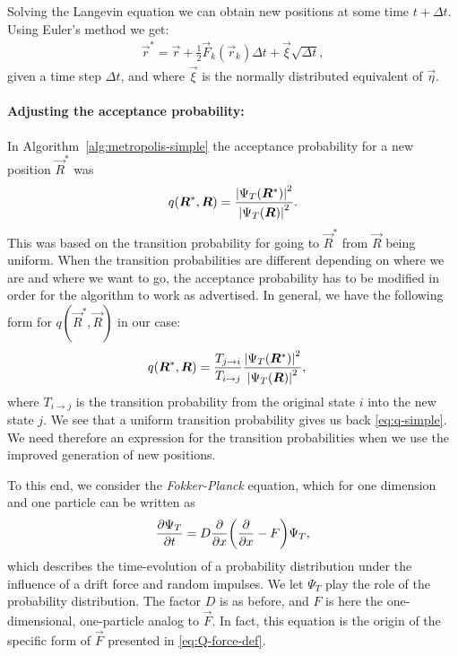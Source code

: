 \documentclass[twocolumn]{article}
\begin{document}
Solving the Langevin equation we can obtain new positions at some time
$t+\Delta t$. Using Euler's method we get:
\begin{align}
    \vec r^* = \vec r + \frac{1}{2}\vec F_k(\vec r_k)\Delta t + \vec \xi\sqrt{\Delta
    t}\label{eq:Langevin-solution},
\end{align}
given a time step $\Delta t$, and where $\vec \xi$ is the normally distributed
equivalent of $\vec \eta$. 

\paragraph{Adjusting the acceptance probability:}$\,$\\
In Algorithm~\ref{alg:metropolis-simple} the acceptance probability for a new
position $\vec R^*$ was
\begin{align}
    q(\bm R^*, \bm R) = \frac{\abs{\Psi_T(\bm R^*)}^2}{\abs{\Psi_T(\bm
    R)}^2}\label{eq:q-simple}.
\end{align}
This was based on the transition probability for going to $\vec R^*$ from $\vec
R$ being uniform. When the transition probabilities are different depending on 
where we are and where we want to go, the acceptance probability has to be
modified in order for the algorithm to work as advertised. In general, we have 
the following form for $q(\vec R^*, \vec R)$ in our case:
\begin{align}
    q(\bm R^*, \bm R) &= \frac{T_{j\rightarrow i}}{T_{i\rightarrow j}}\frac{\abs{\Psi_T(\bm R^*)}^2}{\abs{\Psi_T(\bm
    R)}^2},\label{eq:q-full}
\end{align}
where $T_{i\rightarrow j}$ is the transition probability from the original state
$i$ into the new state $j$. We see that a uniform transition probability gives
us back \eqref{eq:q-simple}. We need therefore an expression for the transition
probabilities when we use the improved generation of new positions.


To this end, we consider the \textit{Fokker-Planck} equation, which for one
dimension and one particle can be written as
\begin{align}
    \pdv{\Psi_T}{t} = D\pdv{}{x}\qty(\pdv{}{x} - F)\Psi_T,\label{eq:Fokker-Planck}
\end{align}
which describes the time-evolution of a probability distribution under the
influence of a drift force and random impulses. We let $\Psi_T$ play the role of the
probability distribution. The factor $D$ is as before, and $F$ is here the
one-dimensional, one-particle analog to $\vec F$. In
fact, this equation is the origin of the specific form of $\vec F$ presented in
\eqref{eq:Q-force-def}. 
\end{document}
